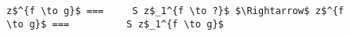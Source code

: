 \begin{figure}[!t]
  \centering
  \begin{minipage}{\columnwidth}
    \begin{lstlisting}[frame=tb]
  z$^{f \to g}$ ===     S z$_1^{f \to ?}$ $\Rightarrow$ z$^{f \to g}$ ===          S z$_1^{f \to g}$
    \end{lstlisting}
  \end{minipage}
\end{figure}